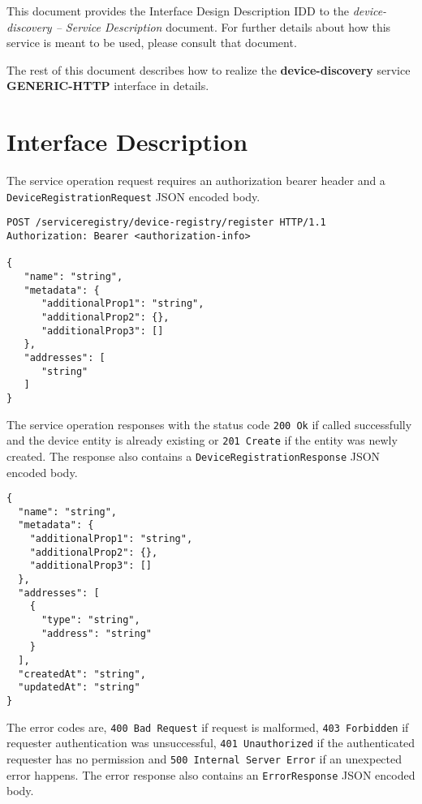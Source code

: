 \documentclass[a4paper]{arrowhead}
\newcommand{\fref}[1]{{\textcolor{ArrowheadBlue}{\hyperref[sec:functions:#1]{#1}}}}
\begin{document}
This document provides the Interface Design Description IDD to the \textit{device-discovery -- Service Description} document.
For further details about how this service is meant to be used, please consult that document.

The rest of this document describes how to realize the \textbf{device-discovery} service \textbf{GENERIC-HTTP} interface in details.

\newpage

\section{Interface Description}
\label{sec:functions}


The service operation request requires an authorization bearer header and a \texttt{DeviceRegistrationRequest} JSON encoded body.

\begin{lstlisting}[language=http,label={lst:register},caption={A \fref{register} request.}]
POST /serviceregistry/device-registry/register HTTP/1.1
Authorization: Bearer <authorization-info>

{
   "name": "string",
   "metadata": {
      "additionalProp1": "string",
      "additionalProp2": {},
      "additionalProp3": []
   },
   "addresses": [
      "string"
   ]
}
\end{lstlisting}

The service operation responses with the status code \texttt{200 Ok} if called successfully and the device entity is already existing or \texttt{201 Create} if the entity was newly created. The response also contains a \texttt{DeviceRegistrationResponse} JSON encoded body.

\begin{lstlisting}[language=http,label={lst:register_response},caption={A \fref{register} success response.}]
{
  "name": "string",
  "metadata": {
    "additionalProp1": "string",
    "additionalProp2": {},
    "additionalProp3": []
  },
  "addresses": [
    {
      "type": "string",
      "address": "string"
    }
  ],
  "createdAt": "string",
  "updatedAt": "string"
}
\end{lstlisting}

The error codes are, \texttt{400 Bad Request} if request is malformed, \texttt{403 Forbidden} if requester authentication was unsuccessful, \texttt{401 Unauthorized} if the authenticated requester has no permission and \texttt{500 Internal Server Error} if an unexpected error happens. The error response also contains an \texttt{ErrorResponse} JSON encoded body.
\end{document}
